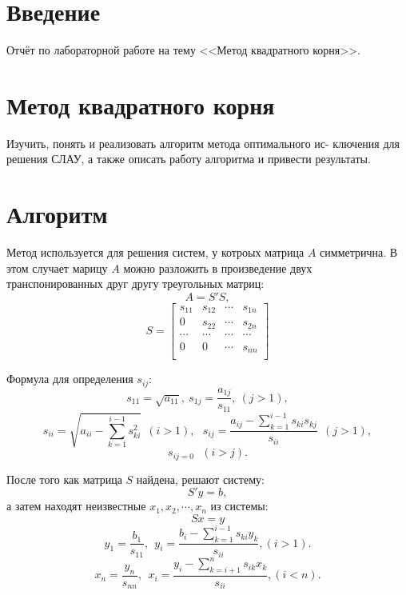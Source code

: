 \documentclass[14pt, titlepage,fleqn]{extarticle}
\begin{document}
	

	
	
	\newpage
	
	\tableofcontents   
	\clearpage
	\section*{Введение}
	Отчёт по лабораторной работе на тему <<Метод квадратного корня>>.	
	\newpage









	\section*{Метод квадратного корня}
	Изучить, понять и реализовать алгоритм метода оптимального ис-
	ключения для решения СЛАУ, а также описать работу алгоритма и
	привести результаты.

	\section*{Алгоритм}
	Метод используется для решения систем, у котроых матрица $A$ симметрична. В этом случает марицу $A$ можно разложить в произведение двух транспонированных друг другу треугольных матриц:
	\[A = S'S,\]
	\[S = \begin{bmatrix}
		s_{11} & s_{12} & \cdots & s_{1n} \\
		0 & s_{22} & \cdots & s_{2n} \\
		\cdots & \cdots & \cdots & \cdots \\
		0 & 0 & \cdots & s_{nn} \\
	\end{bmatrix}\]

	Формула для определения $s_{ij}:$
	\[s_{11} = \sqrt{a_{11}}, ~ s_{1j} = \dfrac{a_{1j}}{s_{11}},~ (j>1),\]
	\[s_{ii} = \sqrt{a_{ii} - \sum_{k = 1}^{i - 1}s^2_{ki}}~~(i>1),~~~ s_{ij} = \dfrac{a_{ij} - \sum_{k = 1}^{i - 1}s_{ki}s_{kj}}{s_{ii}} ~~ (j>1),\]
	\[s_{ij = 0} ~~~ (i>j).\]

	После того как матрица $S$ найдена, решают систему:
	\[S'y =b ,\]
	\newpage
	а затем находят неизвестные $x_1,x_2,\cdots,x_n$ из системы:
	\[Sx = y\]
	\[y_1 = \dfrac{b_1}{s_{11}}, ~~ y_i = \dfrac{b_i - \sum_{k = 1}^{i - 1}s_{ki}y_k}{s_{ii}}, (i > 1).\]
	\[x_n = \dfrac{y_n}{s_{nn}},~~ x_i = \dfrac{y_i - \sum_{k = i+1}^{n}s_{ik}x_k}{s_{ii}}, (i<n).\]
	
\end{document}

